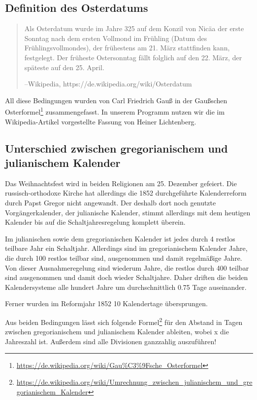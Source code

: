 \subsection{Definition des Osterdatums}
	\begin{quote}
		Als Osterdatum wurde im Jahre 325 auf dem Konzil von Nicäa der erste Sonntag nach dem ersten Vollmond im Frühling (Datum des Frühlingsvollmondes), der frühestens am 21. März stattfinden kann, festgelegt. Der früheste Ostersonntag fällt folglich auf den 22. März, der späteste auf den 25. April.

		\hfill{}--Wikipedia, https://de.wikipedia.org/wiki/Osterdatum
	\end{quote}

	All diese Bedingungen wurden von Carl Friedrich Gauß in der Gaußschen Osterformel\footnote{\url{https://de.wikipedia.org/wiki/Gau\%C3\%9Fsche_Osterformel}} zusammengefasst. In unserem Programm nutzen wir die im Wikipedia-Artikel vorgestellte Fassung von Heiner Lichtenberg.
\subsection{Unterschied zwischen gregorianischem und julianischem Kalender}
	Das Weihnachtsfest wird in beiden Religionen am 25. Dezember gefeiert. Die russisch-orthodoxe Kirche hat allerdings die 1852 durchgeführte Kalenderreform durch Papst Gregor nicht angewandt. Der deshalb dort noch genutzte Vorgängerkalender, der julianische Kalender, stimmt allerdings mit dem heutigen Kalender bis auf die Schaltjahresregelung komplett überein.

	Im julianischen sowie dem gregorianischen Kalender ist jedes durch 4 restlos teilbare Jahr ein Schaltjahr. Allerdings sind im gregorianischem Kalender Jahre, die durch 100 restlos teilbar sind, ausgenommen und damit regelmäßige Jahre. Von dieser Ausnahmeregelung sind wiederum Jahre, die restlos durch 400 teilbar sind ausgenommen und damit doch wieder Schaltjahre. Daher driften die beiden Kalendersysteme alle hundert Jahre um durchschnittlich 0.75 Tage auseinander.

	Ferner wurden im Reformjahr 1852 10 Kalendertage übersprungen.

	Aus beiden Bedingungen lässt sich folgende Formel\footnote{\url{https://de.wikipedia.org/wiki/Umrechnung_zwischen_julianischem_und_gregorianischem_Kalender}} für den Abstand in Tagen zwischen gregorianischem und julianischem Kalender ableiten, wobei x die Jahreszahl ist. Außerdem sind  alle Divisionen ganzzahlig auszuführen! 

